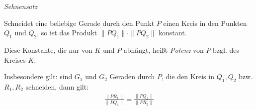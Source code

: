 \begin{mysatz}\textit{Sehnensatz}\medskip

    Schneidet eine beliebige Gerade durch den Punkt $P$ einen Kreis in den Punkten $Q_1$ und $Q_2$, so ist das Produkt $\| P Q_1 \| \cdot \| P Q_2 \|$ konstant.

    Diese Konstante, die nur von $K$ und $P$ abhängt, heißt \textit{Potenz} von $P$ bzgl. des Kreises $K$.

    Insbesondere gilt: sind $G_1$ und $G_2$ Geraden durch $P$, die den Kreis in $Q_1, Q_2$ bzw. $R_1, R_2$ schneiden, dann gilt:
    \begin{align*}
        \frac{\| P R_1 \|}{\| P Q_1 \|} = \frac{\| P Q_2 \|}{\| P R_2 \|}
    \end{align*}
\end{mysatz}


